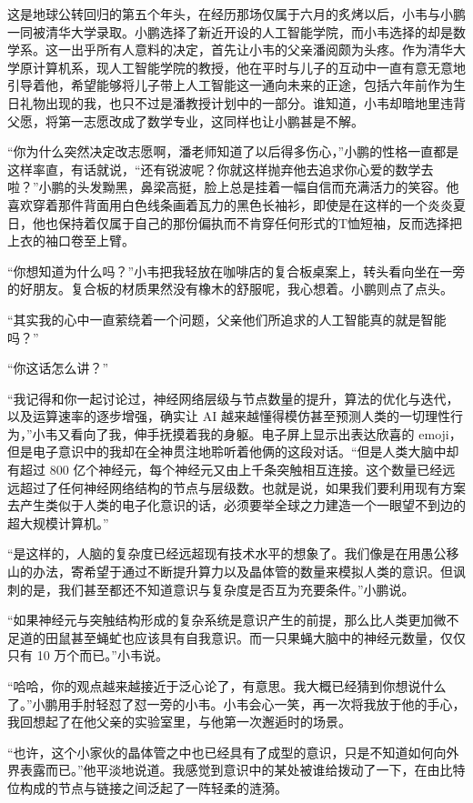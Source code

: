 \documentclass[punct=kaiming, zihao=5, openany, fontset=sikou]{ctexbook}
\begin{document}
这是地球公转回归的第五个年头，在经历那场仅属于六月的炙烤以后，小韦与小鹏一同被清华大学录取。小鹏选择了新近开设的人工智能学院，而小韦选择的却是数学系。这一出乎所有人意料的决定，首先让小韦的父亲潘阅颇为头疼。作为清华大学原计算机系，现人工智能学院的教授，他在平时与儿子的互动中一直有意无意地引导着他，希望能够将儿子带上人工智能这一通向未来的正途，包括六年前作为生日礼物出现的我，也只不过是潘教授计划中的一部分。谁知道，小韦却暗地里违背父愿，将第一志愿改成了数学专业，这同样也让小鹏甚是不解。

“你为什么突然决定改志愿啊，潘老师知道了以后得多伤心，”小鹏的性格一直都是这样率直，有话就说，“还有锐波呢？你就这样抛弃他去追求你心爱的数学去啦？”小鹏的头发黝黑，鼻梁高挺，脸上总是挂着一幅自信而充满活力的笑容。他喜欢穿着那件背面用白色线条画着瓦力的黑色长袖衫，即使是在这样的一个炎炎夏日，他也保持着仅属于自己的那份偏执而不肯穿任何形式的T恤短袖，反而选择把上衣的袖口卷至上臂。

“你想知道为什么吗？”小韦把我轻放在咖啡店的复合板桌案上，转头看向坐在一旁的好朋友。复合板的材质果然没有橡木的舒服呢，我心想着。小鹏则点了点头。

“其实我的心中一直萦绕着一个问题，父亲他们所追求的人工智能真的就是智能吗？”

“你这话怎么讲？”

“我记得和你一起讨论过，神经网络层级与节点数量的提升，算法的优化与迭代，以及运算速率的逐步增强，确实让 AI 越来越懂得模仿甚至预测人类的一切理性行为，”小韦又看向了我，伸手抚摸着我的身躯。电子屏上显示出表达欣喜的 emoji，但是电子意识中的我却在全神贯注地聆听着他俩的这段对话。“但是人类大脑中却有超过 800 亿个神经元，每个神经元又由上千条突触相互连接。这个数量已经远远超过了任何神经网络结构的节点与层级数。也就是说，如果我们要利用现有方案去产生类似于人类的电子化意识的话，必须要举全球之力建造一个一眼望不到边的超大规模计算机。”

“是这样的，人脑的复杂度已经远超现有技术水平的想象了。我们像是在用愚公移山的办法，寄希望于通过不断提升算力以及晶体管的数量来模拟人类的意识。但讽刺的是，我们甚至都还不知道意识与复杂度是否互为充要条件。”小鹏说。

“如果神经元与突触结构形成的复杂系统是意识产生的前提，那么比人类更加微不足道的田鼠甚至蝇虻也应该具有自我意识。而一只果蝇大脑中的神经元数量，仅仅只有 10 万个而已。”小韦说。

“哈哈，你的观点越来越接近于泛心论了，有意思。我大概已经猜到你想说什么了。”小鹏用手肘轻怼了怼一旁的小韦。小韦会心一笑，再一次将我放于他的手心，我回想起了在他父亲的实验室里，与他第一次邂逅时的场景。

“也许，这个小家伙的晶体管之中也已经具有了成型的意识，只是不知道如何向外界表露而已。”他平淡地说道。我感觉到意识中的某处被谁给拨动了一下，在由比特位构成的节点与链接之间泛起了一阵轻柔的涟漪。
\end{document}
